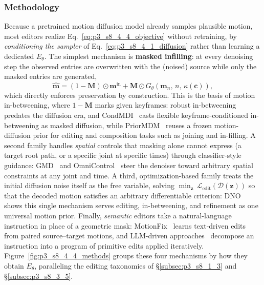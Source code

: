 \subsubsection{Methodology}
\label{subsubsec:p3_s8_4_4_method}
Because a pretrained motion diffusion model already samples plausible motion, most editors realize Eq.~\eqref{eq:p3_s8_4_4_objective} without retraining, by \emph{conditioning the sampler} of Eq.~\eqref{eq:p3_s8_4_1_diffusion} rather than learning a dedicated $E_\theta$. The simplest mechanism is \textbf{masked infilling}: at every denoising step the observed entries are overwritten with the (noised) source while only the masked entries are generated,
\begin{equation}
\label{eq:p3_s8_4_4_inpaint}
\hat{\mathbf{m}}=(1-\mathbf{M})\odot\mathbf{m}^{\text{in}}+\mathbf{M}\odot G_\theta\!\left(\mathbf{m}_n,\,n,\,\kappa(\mathbf{c})\right),
\end{equation}
which directly enforces preservation by construction. This is the basis of motion in-betweening, where $1-\mathbf{M}$ marks given keyframes: robust in-betweening~\cite{harvey2020robust} predates the diffusion era, and CondMDI~\cite{cohan2024condmdi} casts flexible keyframe-conditioned in-betweening as masked diffusion, while PriorMDM~\cite{shafir2024priormdm} reuses a frozen motion-diffusion prior for editing and composition tasks such as joining and in-filling. A second family handles \emph{spatial} controls that masking alone cannot express (a target root path, or a specific joint at specific times) through classifier-style guidance: GMD~\cite{karunratanakul2023gmd} and OmniControl~\cite{xie2024omnicontrol} steer the denoiser toward arbitrary spatial constraints at any joint and time. A third, optimization-based family treats the initial diffusion noise itself as the free variable, solving $\min_{\mathbf{z}}\,\mathcal{L}_{\text{edit}}(\mathcal{D}(\mathbf{z}))$ so that the decoded motion satisfies an arbitrary differentiable criterion: DNO~\cite{karunratanakul2024dno} shows this single mechanism serves editing, in-betweening, and refinement as one universal motion prior. Finally, \emph{semantic} editors take a natural-language instruction in place of a geometric mask: MotionFix~\cite{athanasiou2024motionfix} learns text-driven edits from paired source--target motions, and LLM-driven approaches~\cite{goel2024iterative} decompose an instruction into a program of primitive edits applied iteratively. Figure~\ref{fig:p3_s8_4_4_methods} groups these four mechanisms by how they obtain $E_\theta$, paralleling the editing taxonomies of §\ref{subsec:p3_s8_1_3} and §\ref{subsec:p3_s8_3_5}.


